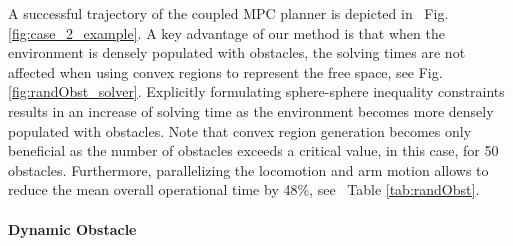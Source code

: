 A successful trajectory of the coupled MPC planner is depicted in ~{Fig. \ref{fig:case_2_example}}. A key advantage of our method is that when the environment is densely populated with obstacles, the solving times are not affected when using convex regions to represent the free space, see Fig. \ref{fig:randObst_solver}. Explicitly formulating sphere-sphere inequality constraints results in an increase of solving time as the environment becomes more densely populated with obstacles. Note that convex region generation becomes only beneficial as the number of obstacles exceeds a critical value, in this case, for 50 obstacles.
Furthermore, parallelizing the locomotion and arm motion allows to reduce the mean overall operational time by 48\%, see ~{Table \ref{tab:randObst}}.
%

\paragraph{Dynamic Obstacle}%
\label{par:dynamic_obstacle}

